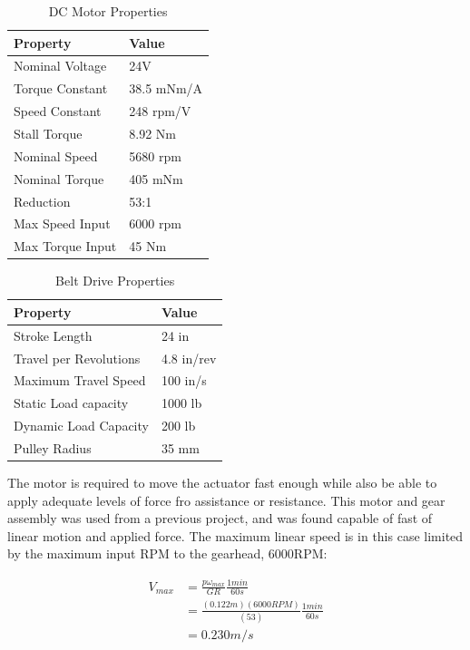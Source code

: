 \documentclass[12pt]{report}
\begin{document}
	\begin{table}[h]
	\centering
	\caption{DC Motor Properties}	
	\begin{tabular}{|l|l|}
		\hline
		\rowcolor{gray!10} \textbf{Property} & \textbf{Value}  \\ \hline
 		Nominal Voltage & 24V  \\ \hline
 		Torque Constant & 38.5 mNm/A \\ \hline
 		Speed Constant & 248 rpm/V  \\ \hline
 		Stall Torque & 8.92 Nm \\ \hline
 		Nominal Speed & 5680 rpm \\ \hline
 		Nominal Torque & 405 mNm \\ \hline
 		Reduction & 53:1  \\ \hline
 		Max Speed Input & 6000 rpm  \\ \hline
 		Max Torque Input & 45 Nm  \\ \hline
		\end{tabular}
	\label{tab:motor}
	\end{table}
	
	
	\begin{table}[h]
	\centering
	\caption{Belt Drive Properties}	
	\begin{tabular}{|l|l|}
		\hline
		\rowcolor{gray!10} \textbf{Property} & \textbf{Value}  \\ \hline
		Stroke Length & 24 in  \\ \hline
 		Travel per Revolutions & 4.8 in/rev  \\ \hline
 		Maximum Travel Speed & 100 in/s  \\ \hline
 		Static Load capacity & 1000 lb  \\ \hline
 		Dynamic Load Capacity & 200 lb  \\ \hline
 		Pulley Radius & 35 mm  \\ \hline
		\end{tabular}
	\label{tab:belt}
	\end{table}
	

	
	The motor is required to move the actuator fast enough while also be able to apply adequate levels of force fro assistance or resistance. This motor and gear assembly was used from a previous project, and was found capable of fast of linear motion and applied force. The maximum linear speed is in this case limited by the maximum input RPM to the gearhead, 6000RPM: 
	
	\begin{align*}
		V_{max} &= \frac{p\omega _{max}}{GR} \frac{1min}{60s} \\
		&= \frac{(0.122m)(6000 RPM)}{(53)} \frac{1min}{60s} \\
		&= 0.230 m/s
	\end{align*}
	
\end{document}
